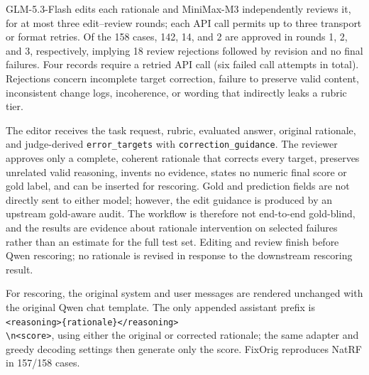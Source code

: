 GLM-5.3-Flash edits each rationale and MiniMax-M3 independently reviews it,
for at most three edit--review rounds; each API call permits up to three
transport or format retries. Of the 158 cases, 142, 14, and 2 are approved in
rounds 1, 2, and 3, respectively, implying 18 review rejections followed by
revision and no final failures. Four records require a retried API call
(six failed call attempts in total). Rejections concern incomplete target
correction, failure to preserve valid content, inconsistent change logs,
incoherence, or wording that indirectly leaks a rubric tier.

The editor receives the task request, rubric, evaluated answer, original
rationale, and judge-derived \texttt{error\_targets} with
\texttt{correction\_guidance}. The reviewer approves only a complete,
coherent rationale that corrects every target, preserves unrelated valid
reasoning, invents no evidence, states no numeric final score or gold label,
and can be inserted for rescoring. Gold and prediction fields are not directly
sent to either model; however, the edit guidance is produced by an upstream
gold-aware audit. The workflow is therefore not end-to-end gold-blind, and
the results are evidence about rationale intervention on selected failures
rather than an estimate for the full test set. Editing and review finish
before Qwen rescoring; no rationale is revised in response to the downstream
rescoring result.

For rescoring, the original system and user messages are rendered unchanged
with the original Qwen chat template. The only appended assistant prefix is
\texttt{<reasoning>\{rationale\}</reasoning>}\\
\texttt{\textbackslash n<score>}, using either the
original or corrected rationale; the same adapter and greedy decoding settings
then generate only the score. FixOrig reproduces NatRF in 157/158 cases.

